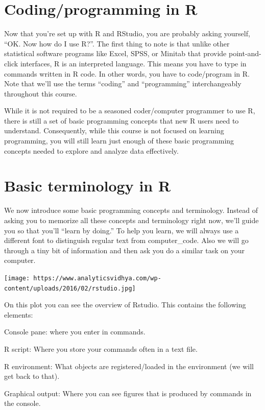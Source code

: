 \documentclass[
]{book}
\begin{document}
\hypertarget{codingprogramming-in-r}{%
\section{Coding/programming in R}\label{codingprogramming-in-r}}

Now that you're set up with R and RStudio, you are probably asking
yourself, ``OK. Now how do I use R?''. The first thing to note is that
unlike other statistical software programs like Excel, SPSS, or Minitab
that provide point-and-click interfaces, R is an interpreted language.
This means you have to type in commands written in R code. In other
words, you have to code/program in R. Note that we'll use the terms
``coding'' and ``programming'' interchangeably throughout this course.

While it is not required to be a seasoned coder/computer programmer to
use R, there is still a set of basic programming concepts that new R
users need to understand. Consequently, while this course is not focused
on learning programming, you will still learn just enough of these basic
programming concepts needed to explore and analyze data effectively.

\hypertarget{basic-terminology-in-r}{%
\section{Basic terminology in R}\label{basic-terminology-in-r}}

We now introduce some basic programming concepts and terminology.
Instead of asking you to memorize all these concepts and terminology
right now, we'll guide you so that you'll ``learn by doing.'' To help
you learn, we will always use a different font to distinguish regular
text from computer\_code. Also we will go through a tiny bit of
information and then ask you do a similar task on your computer.

\texttt{[image: https://www.analyticsvidhya.com/wp-content/uploads/2016/02/rstudio.jpg]}

On this plot you can see the overview of Rstudio. This contains the
following elements:

Console pane: where you enter in commands.

R script: Where you store your commands often in a text file.

R environment: What objects are registered/loaded in the environment (we
will get back to that).

Graphical output: Where you can see figures that is produced by commands
in the console.
\end{document}
